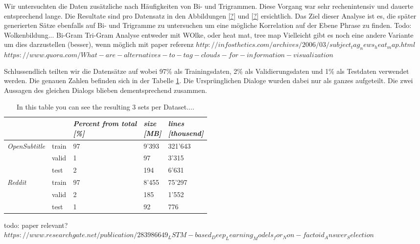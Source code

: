 Wir untersuchten die Daten zusätzliche nach Häufigkeiten von Bi- und Trigrammen. Diese Vorgang war sehr rechenintensiv und dauerte entsprechend lange. Die Resultate sind pro Datensatz in den Abbildungen \ref{?} und \ref{?} ersichtlich. Das Ziel dieser Analyse ist es, die später generierten Sätze ebenfalls auf Bi- und Trigramme zu untersuchen um eine mögliche Korrelation auf der Ebene Phrase zu finden.
Todo: Wolkenbildung...
Bi-Gram Tri-Gram Analyse entweder mit WOlke, oder heat mat, tree map
Vielleicht gibt es noch eine andere Variante um dies darzustellen (besser), wenn möglich mit paper referenz
$http://infosthetics.com/archives/2006/03/subject_tag_news_heat_map.html$
$https://www.quora.com/What-are-alternatives-to-tag-clouds-for-information-visualization$


Schlussendlich teilten wir die Datensätze auf wobei 97\% als Trainingsdaten, 2\% als Validierungsdaten und 1\% als Testdaten verwendet werden. Die genauen Zahlen befinden sich in der Tabelle \ref{tbl:data:split:corpus}. Die Ursprünglichen Dialoge wurden dabei nur als ganzes aufgeteilt. Die zwei Aussagen des gleichen Dialogs blieben dementsprechend zusammen.
\begin{table}[]
	\centering
	\begin{adjustbox}{max width=\textwidth}
		\centering
		\small
		\begin{tabular}{lllll}
			\toprule
			&  \specialcell{\emph{set}}
			&  \specialcell{\emph{Percent from total} \\\textit{[\%]}}
			&  \specialcell{\emph{size} \\\textit{[MB]}}
			&  \specialcell{\emph{lines} \\\textit{[thousend]}}\\
			\midrule
			\emph{OpenSubtitle}		&train	&97	&9'393	&321'643	\\
									&valid	&1	&97		&3'315	\\
									&test	&2	&194	&6'631	\\
			\emph{Reddit}			&train	&97	&8'455	&75'297	\\
									&valid	&2	&185	&1'552	\\
									&test	&1	&92		&776	\\
			\bottomrule
		\end{tabular}
	\end{adjustbox}
	\caption{In this table you can see the resulting 3 sets per Dataset....}
	\label{tbl:data:split:corpus}
\end{table}

todo: paper relevant? $https://www.researchgate.net/publication/283986649_LSTM-based_Deep_Learning_Models_for_Non-factoid_Answer_Selection$
